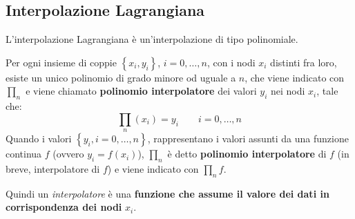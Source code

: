 \subsection{Interpolazione Lagrangiana}

L'interpolazione Lagrangiana è un'interpolazione di tipo polinomiale.

\begin{definitionbox}
	Per ogni insieme di coppie $\left\{x_{i}, y_{i}\right\}$, $i = 0, \dots, n$, con i nodi $x_{i}$ distinti fra loro, esiste un unico polinomio di grado minore od uguale a $n$, che viene indicato con $\prod_{n}$ e viene chiamato \textbf{polinomio interpolatore} dei valori $y_{i}$ nei nodi $x_{i}$, tale che:
	\begin{equation}
		\displaystyle\prod_{n}\left(x_{i}\right) = y_{i} \hspace{2em} i = 0, \dots, n
	\end{equation}
	Quando i valori $\left\{y_{i}, i = 0, \dots, n\right\}$, rappresentano i valori assunti da una funzione continua $f$ (ovvero $y_{i} = f\left(x_{i}\right)$), $\prod_{n}$ è detto \textbf{polinomio interpolatore} di $f$ (in breve, interpolatore di $f$) e viene indicato con $\prod_{n}f$.
\end{definitionbox}

\noindent
Quindi un \emph{interpolatore} è una \textbf{funzione che assume il valore dei dati in corrispondenza dei nodi} $x_{i}$.

